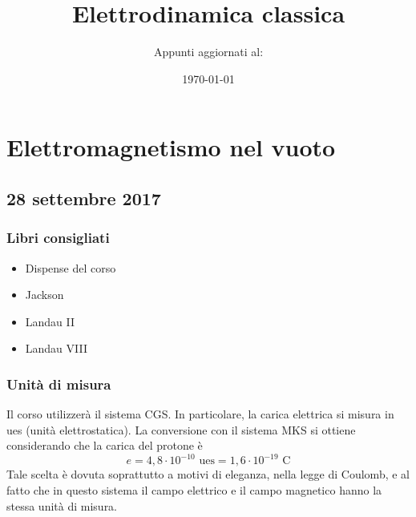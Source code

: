 \documentclass[a4paper,11pt]{book}
\title{Elettrodinamica classica}
\author{Appunti aggiornati al:}
\date{\today}
\theoremstyle{theorem}
\theoremstyle{definition}
\begin{document}
	\maketitle
	\tableofcontents
\chapter{Elettromagnetismo nel vuoto}
\section{28 settembre 2017}
\subsection{Libri consigliati}
\begin{itemize}
	\item Dispense del corso
	\item Jackson
	\item Landau II
	\item Landau VIII
\end{itemize}
\subsection{Unità di misura}
Il corso utilizzerà il sistema CGS. In particolare, la carica elettrica si misura in ues (unità elettrostatica). La conversione con il sistema MKS si ottiene considerando che la carica del protone è
\[e=4,8\cdot10^{-10}\textrm{ ues}=1,6\cdot10^{-19}\textrm{ C}\]
Tale scelta è dovuta soprattutto a motivi di eleganza, nella legge di Coulomb, e al fatto che in questo sistema il campo elettrico e il campo magnetico hanno la stessa unità di misura.
\end{document}
